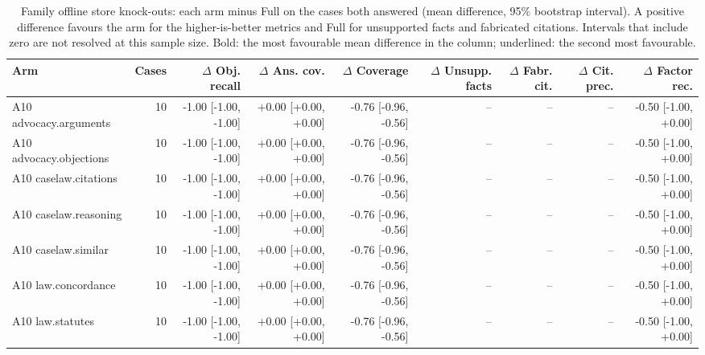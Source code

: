 \begin{table}[t]
\centering\footnotesize
\begin{adjustbox}{max width=\textwidth}
\begin{tabular}{@{}lrrrrrrrr@{}}
\toprule
Arm & Cases & $\Delta$ Obj. recall & $\Delta$ Ans. cov. & $\Delta$ Coverage & $\Delta$ Unsupp. facts & $\Delta$ Fabr. cit. & $\Delta$ Cit. prec. & $\Delta$ Factor rec. \\
\midrule
A10 advocacy.arguments & 10 & -1.00 [-1.00, -1.00] & +0.00 [+0.00, +0.00] & -0.76 [-0.96, -0.56] & -- & -- & -- & -0.50 [-1.00, +0.00] \\
A10 advocacy.objections & 10 & -1.00 [-1.00, -1.00] & +0.00 [+0.00, +0.00] & -0.76 [-0.96, -0.56] & -- & -- & -- & -0.50 [-1.00, +0.00] \\
A10 caselaw.citations & 10 & -1.00 [-1.00, -1.00] & +0.00 [+0.00, +0.00] & -0.76 [-0.96, -0.56] & -- & -- & -- & -0.50 [-1.00, +0.00] \\
A10 caselaw.reasoning & 10 & -1.00 [-1.00, -1.00] & +0.00 [+0.00, +0.00] & -0.76 [-0.96, -0.56] & -- & -- & -- & -0.50 [-1.00, +0.00] \\
A10 caselaw.similar & 10 & -1.00 [-1.00, -1.00] & +0.00 [+0.00, +0.00] & -0.76 [-0.96, -0.56] & -- & -- & -- & -0.50 [-1.00, +0.00] \\
A10 law.concordance & 10 & -1.00 [-1.00, -1.00] & +0.00 [+0.00, +0.00] & -0.76 [-0.96, -0.56] & -- & -- & -- & -0.50 [-1.00, +0.00] \\
A10 law.statutes & 10 & -1.00 [-1.00, -1.00] & +0.00 [+0.00, +0.00] & -0.76 [-0.96, -0.56] & -- & -- & -- & -0.50 [-1.00, +0.00] \\
\bottomrule
\end{tabular}
\end{adjustbox}
\caption{Family offline store knock-outs: each arm minus Full on the cases both answered (mean difference, 95\% bootstrap interval). A positive difference favours the arm for the higher-is-better metrics and Full for unsupported facts and fabricated citations. Intervals that include zero are not resolved at this sample size. Bold: the most favourable mean difference in the column; underlined: the second most favourable.}
\label{tab:ablate_shravani_off}
\end{table}